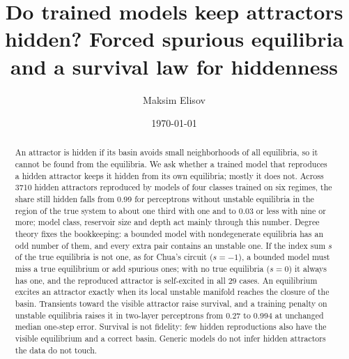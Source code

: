 \documentclass[aip,cha,reprint,amsmath,amssymb,longbibliography]{revtex4-2}
\theoremstyle{definition}
\begin{document}
\title[Do trained models keep attractors hidden?]{Do trained models keep attractors hidden? Forced spurious equilibria and a survival law for hiddenness}

\author{Maksim Elisov}

\date{\today}

\begin{abstract}
An attractor is hidden if its basin avoids small neighborhoods of all equilibria, so it cannot be found from the
equilibria. We ask whether a trained model that reproduces a hidden attractor keeps it hidden from its own
equilibria; mostly it does not. Across 3710 hidden attractors reproduced by models of four classes trained on
six regimes, the share still hidden falls from 0.99 for perceptrons without unstable equilibria in the region of the true
system to about one third with one and to 0.03 or less with nine or more; model class, reservoir size and depth act mainly
through this number. Degree theory fixes the bookkeeping: a bounded model with nondegenerate equilibria has an odd
number of them, and every extra pair contains an unstable one. If the
index sum $s$ of the true equilibria is not one, as for Chua's circuit ($s=-1$), a bounded model must miss a true
equilibrium or add spurious ones; with no true equilibria ($s=0$) it always has one, and the reproduced attractor is
self-excited in all 29 cases. An equilibrium excites an attractor exactly when its local unstable manifold reaches the
closure of the basin. Transients toward the visible attractor raise survival, and a training penalty on unstable
equilibria raises it in two-layer perceptrons from 0.27 to 0.994 at unchanged median one-step error. Survival is not
fidelity: few hidden reproductions also have the visible equilibrium and a correct basin. Generic models do not infer
hidden attractors the data do not touch.
\end{abstract}

\maketitle
\end{document}
